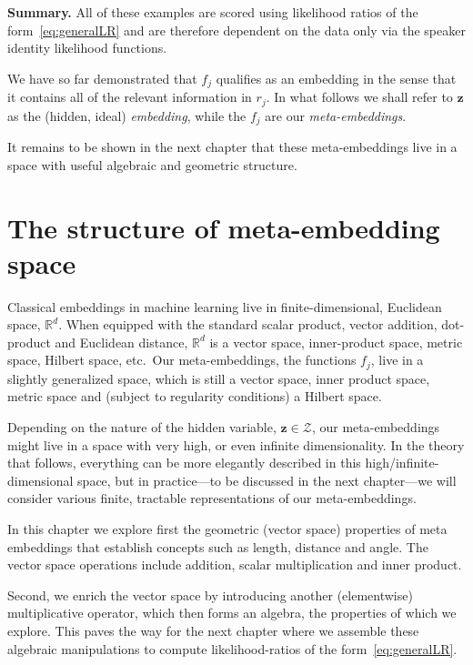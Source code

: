 \documentclass[a4paper,oneside,12pt,english]{report}
\def\zvec{\mathbf{z}}
\def\R{\mathbb{R}}
\def\Zset{\mathcal{Z}}
\def\Zset{\mathcal{Z}}
\begin{document}
\noindent
\textbf{Summary.} All of these examples are scored using likelihood ratios of the form~\eqref{eq:generalLR} and are therefore dependent on the data only via the speaker identity likelihood functions. 

We have so far demonstrated that $f_j$ qualifies as an embedding in the sense that it contains all of the relevant information in $r_j$. In what follows we shall refer to $\zvec$ as the (hidden, ideal) \emph{embedding}, while the $f_j$ are our \emph{meta-embeddings}. 

It remains to be shown in the next chapter that these meta-embeddings live in a space with useful algebraic and geometric structure.
	
	
\chapter{The structure of meta-embedding space}
Classical embeddings in machine learning live in finite-dimensional, Euclidean space, $\R^d$. When equipped with the standard scalar product, vector addition, dot-product and Euclidean distance, $\R^d$ is a vector space, inner-product space, metric space, Hilbert space, etc.\ Our meta-embeddings, the functions $f_j$, live in a slightly generalized space, which is still a vector space, inner product space, metric space and (subject to regularity conditions) a Hilbert space. 

Depending on the nature of the hidden variable, $\zvec\in\Zset$, our meta-embeddings might live in a space with very high, or even infinite dimensionality. In the theory that follows, everything can be more elegantly described in this high/infinite-dimensional space, but in practice---to be discussed in the next chapter---we will consider various finite, tractable representations of our meta-embeddings.

In this chapter we explore first the geometric (vector space) properties of meta embeddings that establish concepts such as length, distance and angle. The vector space operations include addition, scalar multiplication and inner product. 

Second, we enrich the vector space by introducing another (elementwise) multiplicative operator, which then forms an algebra, the properties of which we explore. This paves the way for the next chapter where we assemble these algebraic manipulations to compute likelihood-ratios of the form~\eqref{eq:generalLR}.
\end{document}
